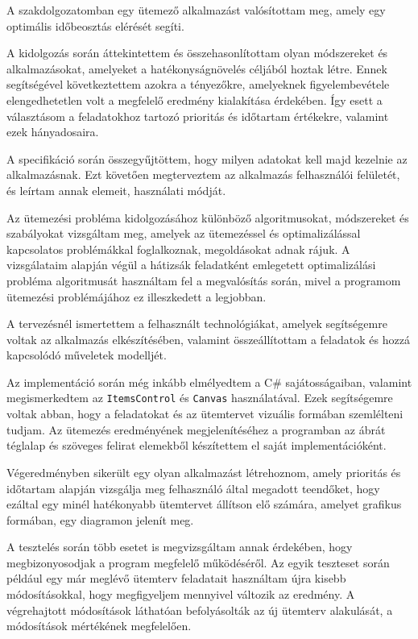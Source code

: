 
A szakdolgozatomban egy ütemező alkalmazást valósítottam meg, amely egy optimális időbeosztás elérését segíti.

A kidolgozás során áttekintettem és összehasonlítottam olyan módszereket és alkalmazásokat, amelyeket a hatékonyságnövelés céljából hoztak létre. Ennek segítségével következtettem azokra a tényezőkre, amelyeknek figyelembevétele elengedhetetlen volt a megfelelő eredmény kialakítása érdekében. Így esett a választásom a feladatokhoz tartozó prioritás és időtartam értékekre, valamint ezek hányadosaira.

A specifikáció során összegyűjtöttem, hogy milyen adatokat kell majd kezelnie az alkalmazásnak. Ezt követően megterveztem az alkalmazás felhasználói felületét, és leírtam annak elemeit, használati módját.

Az ütemezési probléma kidolgozásához különböző algoritmusokat, módszereket és szabályokat vizsgáltam meg, amelyek az ütemezéssel és optimalizálással kapcsolatos problémákkal foglalkoznak, megoldásokat adnak rájuk. A vizsgálataim alapján végül a hátizsák feladatként emlegetett optimalizálási probléma algoritmusát használtam fel a megvalósítás során, mivel a programom ütemezési problémájához ez illeszkedett a legjobban.

A tervezésnél ismertettem a felhasznált technológiákat, amelyek segítségemre voltak az alkalmazás elkészítésében, valamint összeállítottam a feladatok és hozzá kapcsolódó műveletek modelljét.

Az implementáció során még inkább elmélyedtem a C\# sajátosságaiban, valamint megismerkedtem az \texttt{ItemsControl} és \texttt{Canvas} használatával. Ezek segítségemre voltak abban, hogy a feladatokat és az ütemtervet vizuális formában szemlélteni tudjam. Az ütemezés eredményének megjelenítéséhez a programban az ábrát téglalap és szöveges felirat elemekből készítettem el saját implementációként.

Végeredményben sikerült egy olyan alkalmazást létrehoznom, amely prioritás és időtartam alapján vizsgálja meg felhasználó által megadott teendőket, hogy ezáltal egy minél hatékonyabb ütemtervet állítson elő számára, amelyet grafikus formában, egy diagramon jelenít meg.

A tesztelés során több esetet is megvizsgáltam annak érdekében, hogy megbizonyosodjak a program megfelelő működéséről. Az egyik teszteset során például egy már meglévő ütemterv feladatait használtam újra kisebb módosításokkal, hogy megfigyeljem mennyivel változik az eredmény. A végrehajtott módosítások láthatóan befolyásolták az új ütemterv alakulását, a módosítások mértékének megfelelően.

